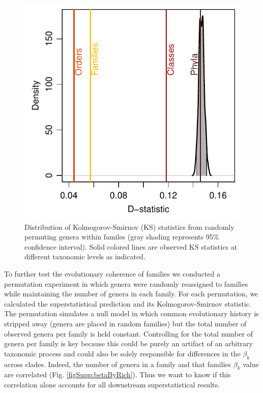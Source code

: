 \documentclass[12pt]{article}
\let\citep=\cite
\begin{document}
\begin{figure}[!h]
  \centering
  \includegraphics[scale=1]{../../fig_dStat.pdf}
  \caption[Goodness of superstatistical theory fit]{Distribution of
    Kolmogorov-Smirnov (KS) statistics from randomly permuting genera
    within familes (gray shading represents 95\% confidence
    interval). Solid colored lines are observed KS statistics at
    different taxonomic levels as indicated.}
  \label{fig:dStat}
\end{figure}

To further test the evolutionary coherence of families we conducted a
permutation experiment in which genera were randomly reassigned to
families while maintaining the number of genera in each family. For
each permutation, we calculated the superstatistical prediction and
its Kolmogorov-Smirnov statistic. The permutation simulates a null
model in which common evolutionary history is stripped away (genera
are placed in random families) but the total number of observed genera
per family is held constant. Controlling for the total number of
genera per family is key because this could be purely an artifact of
an arbitrary taxonomic process \citep{yule1925, berlin1966, hey2001,
  capocci2008} and could also be solely responsible for differences in
the $\beta_k$ across clades. Indeed, the number of genera in a family
and that families $\beta_k$ value are correlated
(Fig. \ref{figSupp:betaByRich}). Thus we want to know if this
correlation alone accounts for all downstream superstatistical
results.
\end{document}
